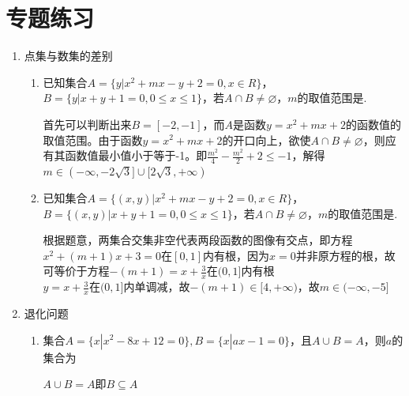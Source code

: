 \chapter*{专题练习}
\begin{enumerate}
    \item 点集与数集的差别
    \begin{enumerate}
        \item  已知集合$A=\{y | x^2+mx-y+2=0, x \in R\}$， $B=\{y | x+y+1=0, 0 \leq x \leq 1\}$，若$A \cap B \neq \varnothing$，$m$的取值范围是\blkda[5]{$(-\infty, -2\sqrt{3}] \cup [2\sqrt{3}, +\infty)$}. 
        \begin{jieda}
            首先可以判断出来$B = [-2, -1]$，而$A$是函数$y = x^2+mx+2$的函数值的取值范围。由于函数$y = x^2+mx+2$的开口向上，欲使$A \cap B \neq \varnothing$，则应有其函数值最小值小于等于-1。即$\frac{m^2}{4} - \frac{m^2}{2} + 2 \leq -1$，解得$m \in (-\infty, -2\sqrt{3}] \cup [2\sqrt{3}, +\infty)$
        \end{jieda}
        \item  已知集合$A=\{(x, y) | x^2+mx-y+2=0, x \in R\}$， $B=\{(x, y) | x+y+1=0, 0 \leq x \leq 1\}$，若$A \cap B \neq \varnothing$，$m$的取值范围是\blkda[2]{$(-\infty, -5]$}. 
        \begin{jieda}
            根据题意，两集合交集非空代表两段函数的图像有交点，即方程$x^2+(m+1)x+3 = 0$在$[0, 1]$内有根，因为$x = 0$并非原方程的根，故可等价于方程$-(m+1) = x + \frac{3}{x}$在$(0, 1]$内有根 \\
            $y = x + \frac{3}{x}$在$(0, 1]$内单调减，故$-(m+1) \in [4, +\infty)$，故$m \in (-\infty, -5]$
        \end{jieda}
    \end{enumerate}
    \item 退化问题
    \begin{enumerate}
        \item 集合$A = \{x | x^2-8x+12 = 0\}, B = \{x | ax-1 = 0\}$，且$A \cup B = A$，则$a$的集合为
        \begin{jieda}
            $A \cup B = A$即$B \subseteq A$

\end{jieda}
\end{enumerate}
\end{enumerate}
